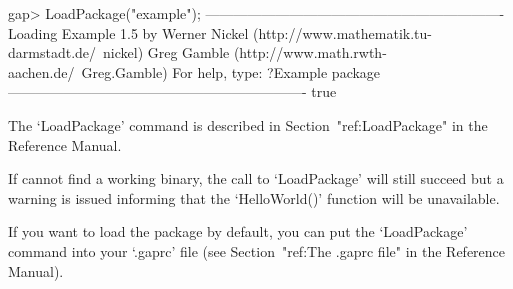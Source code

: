 \beginexample
gap> LoadPackage("example");
----------------------------------------------------------------
Loading  Example 1.5
by Werner Nickel (http://www.mathematik.tu-darmstadt.de/~nickel)
   Greg Gamble (http://www.math.rwth-aachen.de/~Greg.Gamble)
For help, type: ?Example package 
----------------------------------------------------------------
true
\endexample

The `LoadPackage' command is described  in  Section~"ref:LoadPackage"  in
the {\GAP} Reference Manual.

If {\GAP} cannot find a working binary, the call  to  `LoadPackage'  will
still succeed but a warning is issued informing that  the  `HelloWorld()'
function will be unavailable.

If you want to load the {\Example} package by default, you  can  put  the
`LoadPackage' command  into  your  `.gaprc'  file  (see  Section~"ref:The
.gaprc file" in the {\GAP} Reference Manual).

